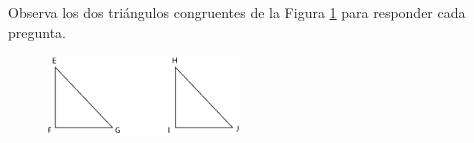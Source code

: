 \question[10] Observa los dos triángulos congruentes de la Figura \ref{fig:congruencia03}  para responder cada pregunta.

\begin{figure}[H]
    \centering
    \includegraphics[width=0.45\textwidth]{../images/congruencia03}
    \caption{}
    \label{fig:congruencia03}
\end{figure}
